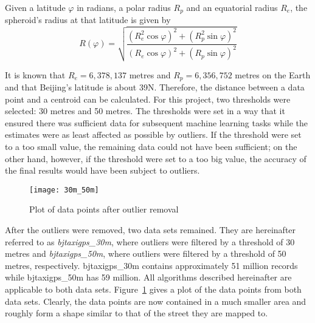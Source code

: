 \begin{theorem}\label{Theorem: radius_latitide}
Given a latitude $\varphi$ in radians, a polar radius $R_{p}$ and an equatorial radius $R_{e}$, the spheroid's radius at that latitude is given by\cite{EAR17}
\begin{equation}
R(\varphi) = \sqrt{\frac{(R_{e}^2\cos\varphi)^2 + (R_{p}^2\sin\varphi)^2}{(R_{e}\cos\varphi)^2 + (R_{p}\sin\varphi)^2}}
\end{equation}
\end{theorem}

It is known that $R_{e} = 6,378,137$ metres and $R_{p} = 6,356,752$ metres on the Earth\cite{NASA16} and that Beijing's latitude is about 39\textdegree N. Therefore, the distance between a data point and a centroid can be calculated. For this project, two thresholds were selected: 30 metres and 50 metres. The thresholds were set in a way that it ensured there was sufficient data for subsequent machine learning tasks while the estimates were as least affected as possible by outliers. If the threshold were set to a too small value, the remaining data could not have been sufficient; on the other hand, however, if the threshold were set to a too big value, the accuracy of the final results would have been subject to outliers. 

\begin{figure}[h]
\texttt{[image: 30m\_50m]}
\centering
\caption{Plot of data points after outlier removal}\label{Fig:after_removal}
\end{figure}

After the outliers were removed, two data sets remained. They are hereinafter referred to as \emph{bjtaxigps\_30m}, where outliers were filtered by a threshold of 30 metres and \emph{bjtaxigps\_50m}, where outliers were filtered by a threshold of 50 metres, respectively. bjtaxigps\_30m contains approximately 51 million records while bjtaxigps\_50m has 59 million. All algorithms described hereinafter are applicable to both data sets. Figure~\ref{Fig:after_removal} gives a plot of the data points from both data sets. Clearly, the data points are now contained in a much smaller area and roughly form a shape similar to that of the street they are mapped to. 
